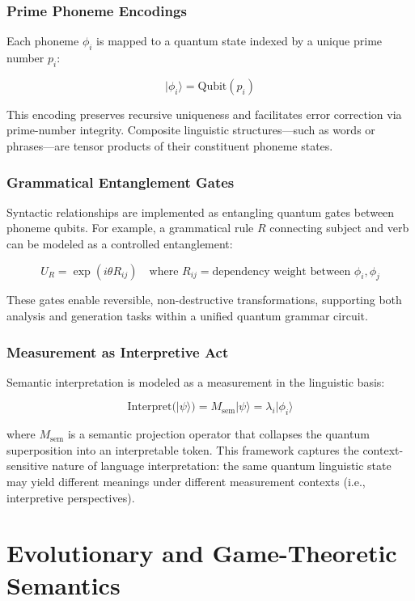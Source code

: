 \documentclass{article}
\theoremstyle{plain}
\theoremstyle{claimstyle}
\begin{document}
\subsubsection*{Prime Phoneme Encodings}

Each phoneme $\phi_i$ is mapped to a quantum state indexed by a unique prime number $p_i$:

\[
|\phi_i\rangle = \text{Qubit}(p_i)
\]

This encoding preserves recursive uniqueness and facilitates error correction via prime-number integrity. Composite linguistic structures—such as words or phrases—are tensor products of their constituent phoneme states.

\subsubsection*{Grammatical Entanglement Gates}

Syntactic relationships are implemented as entangling quantum gates between phoneme qubits. For example, a grammatical rule $R$ connecting subject and verb can be modeled as a controlled entanglement:

\[
U_R = \exp(i \theta R_{ij}) \quad \text{where } R_{ij} = \text{dependency weight between } \phi_i, \phi_j
\]

These gates enable reversible, non-destructive transformations, supporting both analysis and generation tasks within a unified quantum grammar circuit.

\subsubsection*{Measurement as Interpretive Act}

Semantic interpretation is modeled as a measurement in the linguistic basis:

\[
\text{Interpret}( |\psi\rangle ) = M_{\text{sem}} |\psi\rangle = \lambda_i |\phi_i\rangle
\]

where $M_{\text{sem}}$ is a semantic projection operator that collapses the quantum superposition into an interpretable token. This framework captures the context-sensitive nature of language interpretation: the same quantum linguistic state may yield different meanings under different measurement contexts (i.e., interpretive perspectives).

\section{Evolutionary and Game-Theoretic Semantics}
\end{document}
